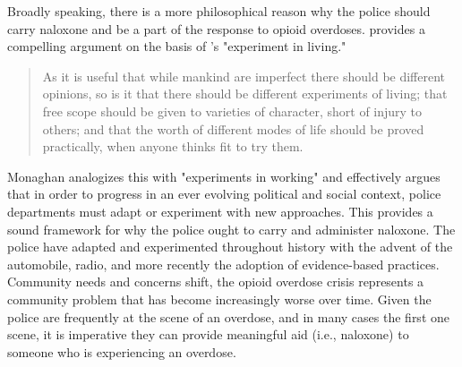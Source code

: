 Broadly speaking, there is a more philosophical reason why the police should carry naloxone and be a part of the response to opioid overdoses. \textcite{monaghan_broken_2022} provides a compelling argument on the basis of \textcite{mill_liberty_1998}'s  "experiment in living." 
\begin{quote}
As it is useful that while mankind are imperfect there should be different opinions, so is it that there should be different experiments of living; that free scope should be given to varieties of character, short of injury to others; and that the worth of different modes of life should be proved practically, when anyone thinks fit to try them. \parencite{mill_liberty_1998}
\end{quote}
Monaghan analogizes this with "experiments in working" and effectively argues that in order to progress in an ever evolving political and social context, police departments must adapt or experiment with new approaches. This provides a sound framework for why the police ought to carry and administer naloxone. The police have adapted and experimented throughout history with the advent of the automobile, radio, and more recently the adoption of evidence-based practices. Community needs and concerns shift, the opioid overdose crisis represents a community problem that has become increasingly worse over time. Given the police are frequently at the scene of an overdose, and in many cases the first one scene, it is imperative they can provide meaningful aid (i.e., naloxone) to someone who is experiencing an overdose. 






